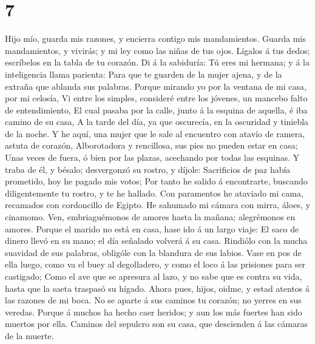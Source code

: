 \hypertarget{section-6}{%
\section{7}\label{section-6}}

 Hijo mío, guarda mis razones, y encierra contigo mis
mandamientos.  Guarda mis mandamientos, y vivirás; y mi ley
como las niñas de tus ojos.  Lígalos á tus dedos; escríbelos
en la tabla de tu corazón.  Di á la sabiduría: Tú eres mi
hermana; y á la inteligencia llama parienta:  Para que te
guarden de la mujer ajena, y de la extraña que ablanda sus palabras.
 Porque mirando yo por la ventana de mi casa, por mi
celosía,  Vi entre los simples, consideré entre los jóvenes,
un mancebo falto de entendimiento,  El cual pasaba por la
calle, junto á la esquina de aquella, é iba camino de su casa,
 A la tarde del día, ya que oscurecía, en la oscuridad y
tiniebla de la noche.  Y he aquí, una mujer que le sale al
encuentro con atavío de ramera, astuta de corazón, 
Alborotadora y rencillosa, sus pies no pueden estar en casa;
 Unas veces de fuera, ó bien por las plazas, acechando por
todas las esquinas.  Y traba de él, y bésalo; desvergonzó
su rostro, y díjole:  Sacrificios de paz había prometido,
hoy he pagado mis votos;  Por tanto he salido á
encontrarte, buscando diligentemente tu rostro, y te he hallado.
 Con paramentos he ataviado mi cama, recamados con
cordoncillo de Egipto.  He sahumado mi cámara con mirra,
áloes, y cinamomo.  Ven, embriaguémonos de amores hasta la
mañana; alegrémonos en amores.  Porque el marido no está en
casa, hase ido á un largo viaje:  El saco de dinero llevó
en su mano; el día señalado volverá á su casa.  Rindiólo
con la mucha suavidad de sus palabras, obligóle con la blandura de sus
labios.  Vase en pos de ella luego, como va el buey al
degolladero, y como el loco á las prisiones para ser castigado;
 Como el ave que se apresura al lazo, y no sabe que es
contra su vida, hasta que la saeta traspasó su hígado. 
Ahora pues, hijos, oidme, y estad atentos á las razones de mi boca.
 No se aparte á sus caminos tu corazón; no yerres en sus
veredas.  Porque á muchos ha hecho caer heridos; y aun los
más fuertes han sido muertos por ella.  Caminos del
sepulcro son su casa, que descienden á las cámaras de la muerte.

